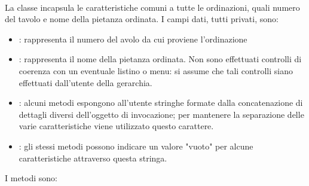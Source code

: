 \paragraph{} %
\label{par:order}
La classe  incapsula le caratteristiche comuni a tutte le ordinazioni, quali numero del tavolo e nome della pietanza ordinata. I campi dati, tutti privati, sono:
\begin{itemize}
	\item {}: rappresenta il numero del avolo da cui proviene l'ordinazione
	\item {}: rappresenta il nome della pietanza ordinata. Non sono effettuati controlli di coerenza con un eventuale listino o menu: si assume che tali controlli siano effettuati dall'utente della gerarchia.
	\item {}: alcuni metodi espongono all'utente stringhe formate dalla concatenazione di dettagli diversi dell'oggetto di invocazione; per mantenere la separazione delle varie caratteristiche viene utilizzato questo carattere.
	\item {}: gli stessi metodi possono indicare un valore "vuoto" per alcune caratteristiche attraverso questa stringa.
\end{itemize}
I metodi sono:
